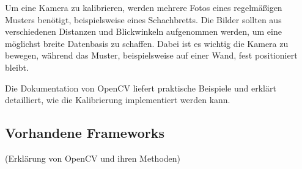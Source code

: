 Um eine Kamera zu kalibrieren, werden mehrere Fotos eines regelmäßigen Musters 
benötigt, beispielsweise eines Schachbretts. Die Bilder sollten aus verschiedenen 
Distanzen und Blickwinkeln aufgenommen werden, um eine möglichst breite Datenbasis 
zu schaffen. Dabei ist es wichtig die Kamera zu bewegen, während das Muster, 
beispielsweise auf einer Wand, fest positioniert bleibt.

Die Dokumentation von OpenCV \cite{opencv_calibration_tutorial} liefert praktische 
Beispiele und erklärt detailliert, wie die Kalibrierung implementiert werden 
kann.


\subsection{Vorhandene Frameworks}
(Erklärung von OpenCV und ihren Methoden)

